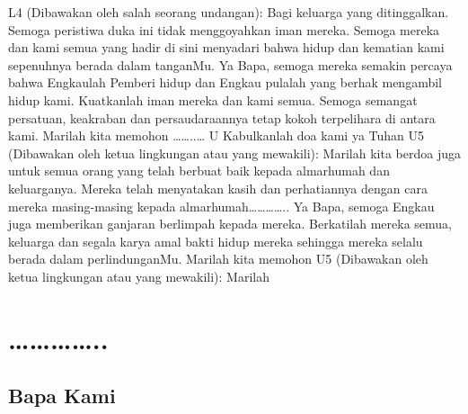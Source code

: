 L4 (Dibawakan oleh salah seorang undangan): Bagi keluarga yang
ditinggalkan. Semoga peristiwa duka ini tidak menggoyahkan iman
mereka. Semoga mereka dan kami semua yang hadir di sini
menyadari bahwa hidup dan kematian kami sepenuhnya berada
dalam tanganMu. Ya Bapa, semoga mereka semakin percaya bahwa
Engkaulah Pemberi hidup dan Engkau pulalah yang berhak
mengambil hidup kami. Kuatkanlah iman mereka dan kami semua.
Semoga semangat persatuan, keakraban dan persaudaraannya tetap
kokoh terpelihara di antara kami. Marilah kita memohon ……..…
U Kabulkanlah doa kami ya Tuhan
U5 (Dibawakan oleh ketua lingkungan atau yang mewakili): Marilah
kita berdoa juga untuk semua orang yang telah berbuat baik kepada
almarhumah dan keluarganya. Mereka telah menyatakan kasih dan
perhatiannya dengan cara mereka masing-masing kepada
almarhumah………….. Ya Bapa, semoga Engkau juga memberikan
ganjaran berlimpah kepada mereka. Berkatilah mereka semua,
keluarga dan segala karya amal bakti hidup mereka sehingga mereka
selalu berada dalam perlindunganMu. Marilah kita memohon
U5 (Dibawakan oleh ketua lingkungan atau yang mewakili): Marilah
\section*{…………..}



\subsection*{Bapa Kami}



